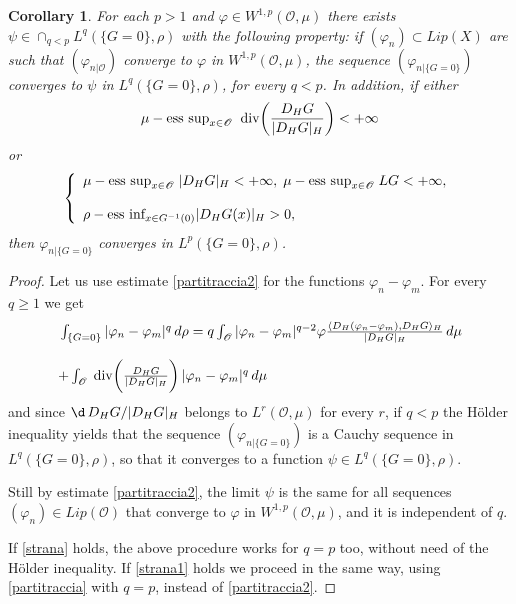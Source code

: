 \documentclass[reqno,twoside,12pt]{amsart}
\newtheorem{Corollary}[Theorem]{Corollary}
\begin{document}
\begin{Corollary}
\label{MaggTraccia}
For each  $p>1$ and  $\varphi \in W^{1,p}({\mathcal O}, \mu)$ there exists $\psi \in \cap_{q<p}L^q(\{G=0\},  \rho)$ with the following property: if  $(\varphi_n )\subset   Lip (X)$ are such that $(\varphi_{n|{\mathcal O}})$ converge to $\varphi$ in   $W^{1,p}({\mathcal O}, \mu)$, the sequence $(\varphi_{n | \{G=0\}} )$ converges to  $\psi$  in $L^q(\{G=0\}, \rho )$, for every $q<p$.
In addition, if either
 \begin{equation}
 \label{strana}
\mu-\mbox{\rm ess sup}_{x\in  {\mathcal O}} \;\;{\operatorname{div}} \bigg( \frac{D_HG}{|D_HG|_H} \bigg)<+\infty
  \end{equation}
or
\begin{equation}
 \label{strana1}
\left\{ \begin{array}{l}
\mu-\mbox{\rm ess sup}_{x\in  {\mathcal O}} \; |D_HG|_H <+\infty, \;\mu-\mbox{\rm ess sup}_{x\in {\mathcal O}}\;
 LG   <+\infty, 
 \\
 \\
\rho-\mbox{\rm ess inf}_{x\in  G^{-1}(0)} |D_HG(x)|_H  >0, 
 \end{array}\right. 
 \end{equation}
 then $\varphi_{n|\{G=0\}}$ converges in $L^p(\{G=0\}, \rho )$.
\end{Corollary}
\begin{proof}  Let us use estimate \eqref{partitraccia2} for the functions $\varphi_n-\varphi_m$.
For every $q\geq 1$ we get 
$$\begin{array}{l}
{\displaystyle}  \int_{\{G=0\}} | \varphi_n-\varphi_m|^q   \,d\rho  = {\displaystyle}  q   \int_{\mathcal O}  | \varphi_n-\varphi_m|^{q-2}\varphi \frac{\langle D_H(\varphi_n-\varphi_m),  D_HG\rangle_H }{|D_HG|_H }  \,d\mu 
\\
\\ + {\displaystyle} \int_{\mathcal O}\;{\operatorname{div}} \bigg( \frac{D_HG}{|D_HG|_H} \bigg)\,|\varphi_n-\varphi_m|^q \,d\mu 
\end{array}
 $$
and since  $\d \,D_HG/|D_HG|_H$ belongs to  $L^{r}({\mathcal O}, \mu)$ for every $r$,  if $q<p$ the H\"older inequality yields that the sequence  $(\varphi_{n|\{G=0\}} )$ is a  Cauchy sequence in $L^q(\{G=0\},  \rho)$, so that it converges to a function $\psi \in L^q(\{G=0\},  \rho)$. 
 
Still by estimate \eqref{partitraccia2}, the limit $\psi$ is the same for all sequences $(\varphi_n)\in  Lip ({\mathcal O})$ that converge to $\varphi$ in   $W^{1,p}({\mathcal O}, \mu)$, and it is independent of $q$. 

\vspace{2mm}

If \eqref{strana} holds, the above procedure works for $q=p$ too,   without need of the H\"older inequality. If  \eqref{strana1} holds we proceed in the same way, using \eqref{partitraccia} with $q=p$, instead of \eqref{partitraccia2}. 
\end{proof}
\end{document}
